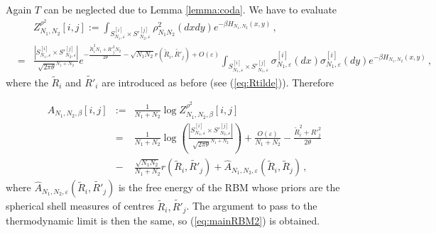\documentclass[10pt,oneside,a4paper,reqno]{amsart}  %
\newcommand{\OOO}[1]{O \left(#1\right)}
\def\bea{\begin{eqnarray}}
\def\eea{\end{eqnarray}}
\def\nn{\nonumber}
\def\e{\varepsilon}
\def\b{\beta}
\def\r{\rho}
\def\s{\sigma}
\theoremstyle{plain}
\numberwithin{equation}{section}
\begin{document}
Again $T$ can be neglected due to Lemma \ref{lemma:coda}. We have to evaluate
\bea
&&Z^{\r^2}_{N_1,N_2}[i,j]:=\int_{S^{[i]}_{N_1,\e}\times {S'}_{N_2,\e}^{[j]}}\r^2_{N_1N_2}(dxdy)e^{-\b H_{N_1,N_2}(x,y)}\,,\nn\\
&=&\frac{|S^{[i]}_{N_1,\e}\times {S'}_{N_2,\e}^{[j]}|}{\sqrt{2\pi\theta}^{N_1+N_2}} e^{-\frac{\tilde R^2_iN_1+{R'}^2_jN_2}{2\theta}-\sqrt{N_1N_2}r\left(\tilde{R}_i, \tilde{R'}_j\right)+\OOO{\e}} \int_{S^{[i]}_{N_1,\e}\times {S'}_{N_1,\e}^{[j]}}\s^{[i]}_{N_1,\e}(dx)\s^{[i]}_{N_1,\e}(dy) e^{-\b H_{N_1,N_2}(x,y)}\,,\nn
\eea
where the $\tilde R_i$ and $\tilde {R'}_i$ are introduced as before (see (\ref{eq:Rtilde})). Therefore

\bea
A_{N_1,N_2,\b}[i,j]&:=&\frac{1}{N_1+N_2}\log Z^{\r^2}_{N_1,N_2,\b}[i,j]\nn\\
&=&\frac{1}{N_1+N_2}\log\left(\frac{|S^{[i]}_{N_1,\e}\times {S'}_{N_2,\e}^{[j]}|}{\sqrt{2\pi\theta}^{N_1+N_2}}\right)+\frac{\OOO{\e}}{N_1+N_2} -\frac{\tilde R^2_i+{R'}^2_j}{2\theta}\nn\\
&-&\frac{\sqrt{N_1N_2}}{N_1+N_2}r\left(\tilde R_i, \tilde {R'}_j\right)+\widehat A_{N_1,N_2,\e}(\tilde R_i, \tilde R_j)\nn\,,
\eea
where $\widehat A_{N_1,N_2,\e}(\tilde R_i, \tilde {R'}_j)$ is the free energy of the RBM whose priors are the spherical shell measures of centres $\tilde R_i, \tilde {R'}_j$. The argument to pass to the thermodynamic limit is then the same, so (\ref{eq:mainRBM2}) is obtained. 
\end{document}
